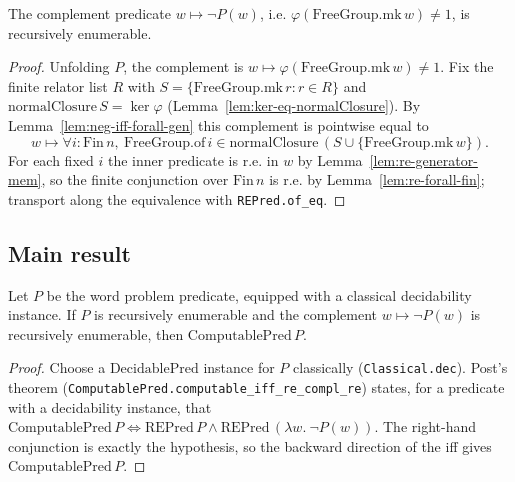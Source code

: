 \begin{lemma}
    \label{lem:re-negative}
    \leanok
    The complement predicate $w \mapsto \neg P(w)$, i.e.
    $\varphi(\mathrm{FreeGroup.mk}\,w) \neq 1$, is recursively enumerable.
\end{lemma}
\begin{proof}
    Unfolding $P$, the complement is $w \mapsto
    \varphi(\mathrm{FreeGroup.mk}\,w) \neq 1$. Fix the finite relator list $R$ with
    $S = \{\mathrm{FreeGroup.mk}\,r : r \in R\}$ and $\mathrm{normalClosure}\,S =
    \ker\varphi$ (Lemma~\ref{lem:ker-eq-normalClosure}). By
    Lemma~\ref{lem:neg-iff-forall-gen} this complement is pointwise equal to
    \[
        w \mapsto \forall i : \mathrm{Fin}\,n,\ \mathrm{FreeGroup.of}\,i \in
            \mathrm{normalClosure}\,(S \cup \{\mathrm{FreeGroup.mk}\,w\}).
    \]
    For each fixed $i$ the inner predicate is r.e. in $w$ by
    Lemma~\ref{lem:re-generator-mem}, so the finite conjunction over
    $\mathrm{Fin}\,n$ is r.e. by Lemma~\ref{lem:re-forall-fin}; transport along the
    equivalence with \texttt{REPred.of\_eq}.
\end{proof}

\subsection{Main result}

\begin{lemma}
    \label{lem:post-re-compl}
    \leanok
    Let $P$ be the word problem predicate, equipped with a classical decidability
    instance. If $P$ is recursively enumerable and the complement
    $w \mapsto \neg P(w)$ is recursively enumerable, then
    $\mathrm{ComputablePred}\,P$.
\end{lemma}
\begin{proof}
    Choose a $\mathrm{DecidablePred}$ instance for $P$ classically
    (\texttt{Classical.dec}). Post's theorem
    (\texttt{ComputablePred.computable\_iff\_re\_compl\_re}) states, for a
    predicate with a decidability instance, that $\mathrm{ComputablePred}\,P \iff
    \mathrm{REPred}\,P \wedge \mathrm{REPred}\,(\lambda w.\ \neg P(w))$. The
    right-hand conjunction is exactly the hypothesis, so the backward direction of
    the iff gives $\mathrm{ComputablePred}\,P$.
\end{proof}

